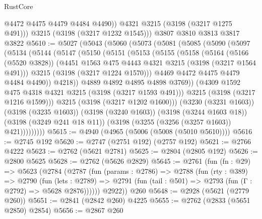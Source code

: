 \begin{lexlean}{RustCore}
\begin{coremodule}
            @4472
            @4475
            @4479
            @4484
            @4490))
        @4321
        @3215
        (@3198 (@3217 @1275 @491)))
      @3215
      (@3198 (@3217 @1232 @1545)))
    @3807
    @3810
    @3813
    @3817
    @3822
@5610 := @5027
    (@5043
      (@5060
        (@5073
          (@5081
            (@5085
              (@5090
                (@5097
                  (@5134
                    (@5144
                      (@5147
                        (@5150
                          (@5151
                            (@5153
                              (@5155
                                (@5158
                                  (@5164
                                    (@5166 (@5520 @3828))
                                    (@4451 @1563 @475 @4443 @4321 @3215 (@3198 (@3217 @1564 @491)))
                                    @3215
                                    (@3198 (@3217 @1224 @1570)))
                                  @4469
                                  @4472
                                  @4475
                                  @4479
                                  @4484
                                  @4490))
                              @4218))
                          @4889
                          @4892
                          @4895
                          @4898
                          @3769))
                      (@4309 @1592 @475 @4318 @4321 @3215 (@3198 (@3217 @1593 @491)))
                      @3215
                      (@3198 (@3217 @1216 @1599)))
                    @3215
                    (@3198 (@3217 @1202 @1600)))
                  (@3230 (@3231 @1603))
                  (@3198 (@3235 @1603))
                  (@3198 (@3240 @1603))
                  (@3198 (@3244 @1603 @18))
                  (@3198 (@3249 @241 @18 @11))
                  (@3198 (@3255 (@3256 (@3257 @1603)) @421)))))))))
@5615 := @4940 (@4965 (@5006 (@5008 (@5010 @5610))))
@5616 := @2745 @192
@5620 := @2747 (@2751 @192) (@2757 @192)
@5621 := @2766 @4222
@5623 := @2762 (@5621 @2781)
@5625 := @2804 (@2805 @192)
@5626 := @2800 @5625
@5628 := @2762 (@5626 @2829)
@5645 := @2761
    (fun (fn : @29) =>
    @5623
      (@2784
        (@2787
          (fun (params : @2786) =>
          @2788
            (fun (rty : @389) =>
            @2790
              (fun (lets : @2789) =>
              @2791 (fun (tail : @501) => @2793 (fun (Γ : @2792) => @5628 @2876))))))
        @2922))
    @260
@5648 := @2928 (@5621 (@2779 @260))
@5651 := @2841 (@2842 @260) @4225
@5655 := @2762 (@2833 (@5651 @2850) @2854)
@5656 := @2867 @260

\end{coremodule}
\end{lexlean}
